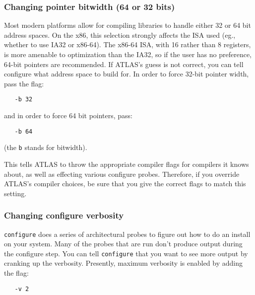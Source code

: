 \documentclass[11pt]{article}
\begin{document}
\subsubsection{Changing pointer bitwidth (64 or 32 bits)}
\label{sec-bitwidth}
Most modern platforms allow for compiling libraries to handle either 32 or
64 bit address spaces.  On the x86, this selection strongly affects the ISA
used (eg., whether to use IA32 or x86-64).  The x86-64 ISA, with 16 rather
than 8 registers, is more
amenable to optimization than the IA32, so if the user has no preference,
64-bit pointers are recommended.
If ATLAS's guess is not correct,
you can tell configure what address space to build for.  In order to force
32-bit pointer width, pass the flag:
\vspace*{-0.1in}
\begin{verbatim}
   -b 32
\end{verbatim}
and in order to force 64 bit pointers, pass:
\vspace*{-0.1in}
\begin{verbatim}
   -b 64
\end{verbatim}
(the {\tt b} stands for bitwidth).

This tells ATLAS to throw the appropriate compiler flags for compilers it
knows about, as well as effecting various configure probes.  Therefore, if
you override ATLAS's compiler choices, be sure that you give the correct
flags to match this setting.

\subsubsection{Changing configure verbosity}
\label{sec-verb}
{\tt configure} does a series of architectural probes to figure out how to do
an install on your system.  Many of the probes that are run don't produce
output during the configure step.  You can tell {\tt configure} that you want
to see more output by cranking up the verbosity.  Presently, maximum 
verbosity is enabled by adding the flag:
\vspace*{-0.1in}
\begin{verbatim}
   -v 2
\end{verbatim}
\end{document}

